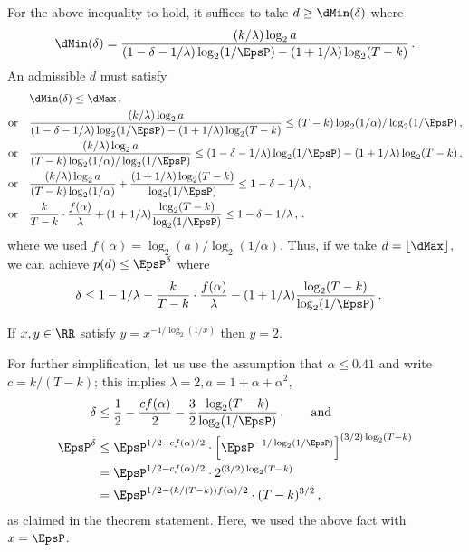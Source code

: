 	For the above inequality to hold, 
	it suffices to take $d \geq \dMin(\delta)$ where 
	$$
		\dMin(\delta) = \frac{(k/\lambda) \log_2 a}{(1 - \delta - 1/\lambda) \log_2(1/\EpsP) - (1+1/\lambda) \log_2(T - k)}
		\,.
	$$
	An admissible $d$ must satisfy
	\begin{align*}
		&\dMin(\delta) \leq \dMax	\,,\\
		\text{or}\quad &			
			\frac{(k/\lambda) \log_2 a}{(1 - \delta - 1/\lambda) \log_2(1/\EpsP) - (1+1/\lambda) \log_2(T - k)}
				\leq (T - k) \log_2(1/\alpha)/\log_2(1/\EpsP) \,,\\
		\text{or}\quad &			
			\frac{(k/\lambda) \log_2 a}{(T - k) \log_2(1/\alpha)/\log_2(1/\EpsP)} 
				\leq (1 - \delta - 1/\lambda) \log_2(1/\EpsP) - (1+1/\lambda) \log_2(T - k) \,,\\
    \text{or}\quad &      
      \frac{(k/\lambda) \log_2 a}{(T - k) \log_2(1/\alpha)} + \frac{(1+1/\lambda) \log_2(T - k)}{\log_2(1/\EpsP)}
        \leq 1 - \delta - 1/\lambda  \,,\\
    \text{or}\quad &      
      \frac{k}{T-k}\cdot \frac{f(\alpha)}{\lambda} + (1+1/\lambda) \frac{ \log_2(T - k)}{\log_2(1/\EpsP)}
        \leq 1 - \delta - 1/\lambda  \,,
				\,.
	\end{align*}
  where we used $f(\alpha) = \log_2(a)/\log_2(1/\alpha)$. 
	Thus, if we take $d = \lfloor \dMax \rfloor$, we can achieve  $p(d) \leq \EpsP^{\delta}$ 
	where 
	\begin{align}
		\delta
      &\leq 1 - 1/\lambda - \frac{k}{T-k}\cdot \frac{f(\alpha)}{\lambda} - (1+1/\lambda) \frac{ \log_2(T - k)}{\log_2(1/\EpsP)}\,. \label{eq:delta}    
	\end{align}


  \begin{fact*}
    If $x,y \in \RR$ satisfy $y = x^{-1/\log_2(1/x)}$ then $y = 2$.
  \end{fact*}
  \noindent
  For further simplification, let us use the assumption that $\alpha \leq 0.41$ 
  and write $c = k/(T-k)$; 
  this implies $\lambda = 2, a = 1 + \alpha + \alpha^2$, 
  \begin{align*}
    \delta
      &\leq \frac{1}{2} - \frac{c f(\alpha)}{2} - \frac{3}{2} \frac{ \log_2(T - k)}{\log_2(1/\EpsP)}\,, 
      \qquad \text{and}\\
    \EpsP^\delta  
      &\leq \EpsP^{1/2 - c f(\alpha)/2} \cdot \left[ \EpsP^{-1/\log_2(1/\EpsP)} \right]^{(3/2)\log_2(T - k)} \\
      &= \EpsP^{1/2 - c f(\alpha)/2} \cdot 2^{(3/2)\log_2(T - k)} \\
      &= \EpsP^{1/2 - (k/(T-k)) f(\alpha)/2} \cdot (T - k)^{3/2} 
      \,,
  \end{align*}
  as claimed in the theorem statement. 
  Here, we used the above fact with $x = \EpsP$.

